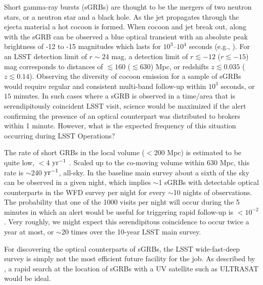 \documentclass[DM,lsstdraft,authoryear,toc]{lsstdoc}
\begin{document}
Short gamma-ray bursts (sGRBs) are thought to be the mergers of two neutron stars, or a neutron star and a black hole.
As the jet propagates through the ejecta material a hot cocoon is formed.
When cocoon and jet break out, along with the sGRB can be observed a blue optical transient with an absolute peak brightness of -12 to -15 magnitudes which lasts for $10^3$--$10^4$ seconds (e.g., \citealt{2018MNRAS.473..576G}).
For an LSST detection limit of $r\sim24$ mag, a detection limit of $r\lesssim-12$ ($r\lesssim-15$) mag corresponds to distances of $\lesssim160$ ($\lesssim630$) Mpc, or redshifts $z\lesssim0.035$ ($z\lesssim0.14$).
Observing the diversity of cocoon emission for a sample of sGRBs would require regular and consistent multi-band follow-up within $10^3$ seconds, or $15$ minutes.
In such cases where a sGRB is observed in a time/area that is serendipitously coincident LSST visit, science would be maximized if the alert confirming the presence of an optical counterpart was distributed to brokers within 1 minute.
However, what is the expected frequency of this situation occurring during LSST Operations?

The rate of short GRBs in the local volume ($<$200 Mpc) is estimated to be quite low, $<$4 $\rm yr^{-1}$ \citep{2019arXiv190800100M}.
Scaled up to the co-moving volume within 630 Mpc, this rate is $\sim$240 $\rm yr^{-1}$, all-sky.
In the baseline main survey about a sixth of the sky can be observed in a given night, which implies $\sim$1 sGRBs with detectable optical counterparts in the WFD survey per night for every $\sim$10 nights of observations.
The probability that one of the 1000 visits per night will occur during the 5 minutes in which an alert would be useful for triggering rapid follow-up is $<10^{-2}$.
Very roughly, we might expect this serendipitous coincidence to occur twice a year at most, or $\sim$20 times over the 10-year LSST main survey.


For discovering the optical counterparts of sGRBs, the LSST wide-fast-deep survey is simply not the most efficient future facility for the job.
As described by \citet{2018MNRAS.473..576G}, a rapid search at the location of sGRBs with a UV satellite such as ULTRASAT would be ideal.
\end{document}

